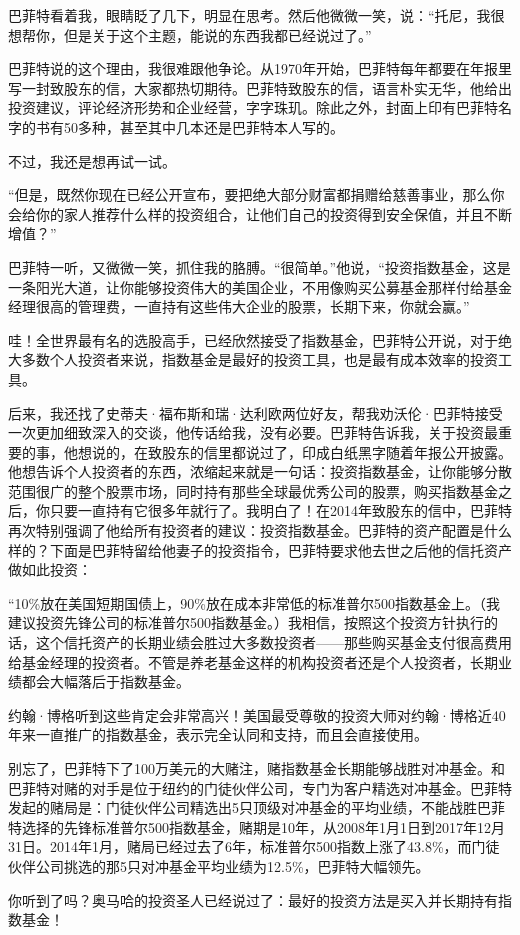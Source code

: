 巴菲特看着我，眼睛眨了几下，明显在思考。然后他微微一笑，说：“托尼，我很想帮你，但是关于这个主题，能说的东西我都已经说过了。”

巴菲特说的这个理由，我很难跟他争论。从1970年开始，巴菲特每年都要在年报里写一封致股东的信，大家都热切期待。巴菲特致股东的信，语言朴实无华，他给出投资建议，评论经济形势和企业经营，字字珠玑。除此之外，封面上印有巴菲特名字的书有50多种，甚至其中几本还是巴菲特本人写的。

不过，我还是想再试一试。

“但是，既然你现在已经公开宣布，要把绝大部分财富都捐赠给慈善事业，那么你会给你的家人推荐什么样的投资组合，让他们自己的投资得到安全保值，并且不断增值？”

巴菲特一听，又微微一笑，抓住我的胳膊。“很简单。”他说，“投资指数基金，这是一条阳光大道，让你能够投资伟大的美国企业，不用像购买公募基金那样付给基金经理很高的管理费，一直持有这些伟大企业的股票，长期下来，你就会赢。”

哇！全世界最有名的选股高手，已经欣然接受了指数基金，巴菲特公开说，对于绝大多数个人投资者来说，指数基金是最好的投资工具，也是最有成本效率的投资工具。

后来，我还找了史蒂夫·福布斯和瑞·达利欧两位好友，帮我劝沃伦·巴菲特接受一次更加细致深入的交谈，他传话给我，没有必要。巴菲特告诉我，关于投资最重要的事，他想说的，在致股东的信里都说过了，印成白纸黑字随着年报公开披露。他想告诉个人投资者的东西，浓缩起来就是一句话：投资指数基金，让你能够分散范围很广的整个股票市场，同时持有那些全球最优秀公司的股票，购买指数基金之后，你只要一直持有它很多年就行了。我明白了！在2014年致股东的信中，巴菲特再次特别强调了他给所有投资者的建议：投资指数基金。巴菲特的资产配置是什么样的？下面是巴菲特留给他妻子的投资指令，巴菲特要求他去世之后他的信托资产做如此投资：

“10\%放在美国短期国债上，90\%放在成本非常低的标准普尔500指数基金上。（我建议投资先锋公司的标准普尔500指数基金。）我相信，按照这个投资方针执行的话，这个信托资产的长期业绩会胜过大多数投资者——那些购买基金支付很高费用给基金经理的投资者。不管是养老基金这样的机构投资者还是个人投资者，长期业绩都会大幅落后于指数基金。

约翰·博格听到这些肯定会非常高兴！美国最受尊敬的投资大师对约翰·博格近40年来一直推广的指数基金，表示完全认同和支持，而且会直接使用。

别忘了，巴菲特下了100万美元的大赌注，赌指数基金长期能够战胜对冲基金。和巴菲特对赌的对手是位于纽约的门徒伙伴公司，专门为客户精选对冲基金。巴菲特发起的赌局是：门徒伙伴公司精选出5只顶级对冲基金的平均业绩，不能战胜巴菲特选择的先锋标准普尔500指数基金，赌期是10年，从2008年1月1日到2017年12月31日。2014年1月，赌局已经过去了6年，标准普尔500指数上涨了43.8\%，而门徒伙伴公司挑选的那5只对冲基金平均业绩为12.5\%，巴菲特大幅领先。

你听到了吗？奥马哈的投资圣人已经说过了：最好的投资方法是买入并长期持有指数基金！
